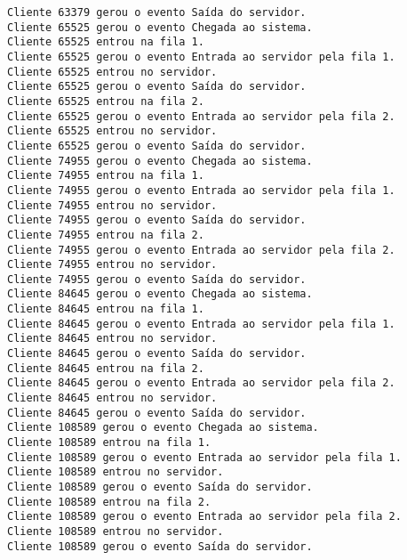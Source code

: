 \begin{verbatim}
Cliente 63379 gerou o evento Saída do servidor.
Cliente 65525 gerou o evento Chegada ao sistema.
Cliente 65525 entrou na fila 1.
Cliente 65525 gerou o evento Entrada ao servidor pela fila 1.
Cliente 65525 entrou no servidor.
Cliente 65525 gerou o evento Saída do servidor.
Cliente 65525 entrou na fila 2.
Cliente 65525 gerou o evento Entrada ao servidor pela fila 2.
Cliente 65525 entrou no servidor.
Cliente 65525 gerou o evento Saída do servidor.
Cliente 74955 gerou o evento Chegada ao sistema.
Cliente 74955 entrou na fila 1.
Cliente 74955 gerou o evento Entrada ao servidor pela fila 1.
Cliente 74955 entrou no servidor.
Cliente 74955 gerou o evento Saída do servidor.
Cliente 74955 entrou na fila 2.
Cliente 74955 gerou o evento Entrada ao servidor pela fila 2.
Cliente 74955 entrou no servidor.
Cliente 74955 gerou o evento Saída do servidor.
Cliente 84645 gerou o evento Chegada ao sistema.
Cliente 84645 entrou na fila 1.
Cliente 84645 gerou o evento Entrada ao servidor pela fila 1.
Cliente 84645 entrou no servidor.
Cliente 84645 gerou o evento Saída do servidor.
Cliente 84645 entrou na fila 2.
Cliente 84645 gerou o evento Entrada ao servidor pela fila 2.
Cliente 84645 entrou no servidor.
Cliente 84645 gerou o evento Saída do servidor.
Cliente 108589 gerou o evento Chegada ao sistema.
Cliente 108589 entrou na fila 1.
Cliente 108589 gerou o evento Entrada ao servidor pela fila 1.
Cliente 108589 entrou no servidor.
Cliente 108589 gerou o evento Saída do servidor.
Cliente 108589 entrou na fila 2.
Cliente 108589 gerou o evento Entrada ao servidor pela fila 2.
Cliente 108589 entrou no servidor.
Cliente 108589 gerou o evento Saída do servidor.
\end{verbatim}